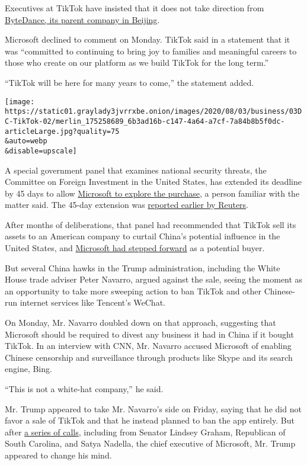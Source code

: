 Executives at TikTok have insisted that it does not take direction from
\href{https://www.nytimes3xbfgragh.onion/2020/08/03/technology/tiktok-bytedance-us-china.html}{ByteDance,
its parent company in Beijing}.

Microsoft declined to comment on Monday. TikTok said in a statement that
it was ``committed to continuing to bring joy to families and meaningful
careers to those who create on our platform as we build TikTok for the
long term.''

``TikTok will be here for many years to come,'' the statement added.

\texttt{[image: https://static01.graylady3jvrrxbe.onion/images/2020/08/03/business/03DC-TikTok-02/merlin\_175258689\_6b3ad16b-c147-4a64-a7cf-7a84b8b5f0dc-articleLarge.jpg?quality=75\\\&auto=webp\\\&disable=upscale]}

A special government panel that examines national security threats, the
Committee on Foreign Investment in the United States, has extended its
deadline by 45 days to allow
\href{https://www.nytimes3xbfgragh.onion/2020/08/03/technology/tiktok-microsoft-tweens.html}{Microsoft
to explore the purchase}, a person familiar with the matter said. The
45-day extension was
\href{https://www.reuters.com/article/us-usa-tiktok-trump-exclusive/exclusive-trump-gives-microsoft-45-days-to-clinch-tiktok-deal-idUSKBN24Y0UD}{reported
earlier by Reuters}.

After months of deliberations, that panel had recommended that TikTok
sell its assets to an American company to curtail China's potential
influence in the United States, and
\href{https://www.nytimes3xbfgragh.onion/2020/07/31/technology/tiktok-microsoft.html}{Microsoft
had stepped forward} as a potential buyer.

But several China hawks in the Trump administration, including the White
House trade adviser Peter Navarro, argued against the sale, seeing the
moment as an opportunity to take more sweeping action to ban TikTok and
other Chinese-run internet services like Tencent's WeChat.

On Monday, Mr. Navarro doubled down on that approach, suggesting that
Microsoft should be required to divest any business it had in China if
it bought TikTok. In an interview with CNN, Mr. Navarro accused
Microsoft of enabling Chinese censorship and surveillance through
products like Skype and its search engine, Bing.

``This is not a white-hat company,'' he said.

Mr. Trump appeared to take Mr. Navarro's side on Friday, saying that he
did not favor a sale of TikTok and that he instead planned to ban the
app entirely. But after
\href{https://www.nytimes3xbfgragh.onion/2020/08/02/business/economy/trump-tiktok-china-national-security.html}{a
series of calls}, including from Senator Lindsey Graham, Republican of
South Carolina, and Satya Nadella, the chief executive of Microsoft, Mr.
Trump appeared to change his mind.

